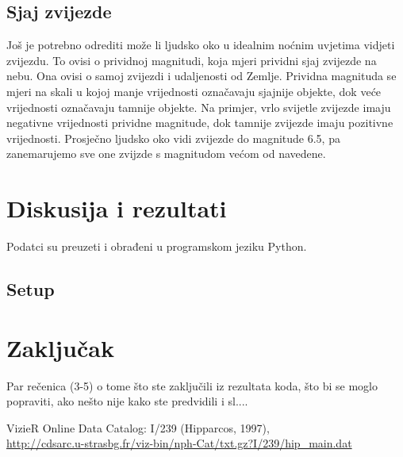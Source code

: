 \documentclass[a4paper,12pt]{article}
\begin{document}
\subsection{Sjaj zvijezde}
Još je potrebno odrediti može li ljudsko oko u idealnim noćnim uvjetima vidjeti zvijezdu. To ovisi o prividnoj magnitudi, koja mjeri prividni sjaj zvijezde na nebu. Ona ovisi o samoj zvijezdi i udaljenosti od Zemlje.
Prividna magnituda se mjeri na skali u kojoj manje vrijednosti označavaju sjajnije objekte, dok veće vrijednosti označavaju tamnije objekte. Na primjer, vrlo svijetle zvijezde imaju negativne vrijednosti prividne magnitude, dok tamnije zvijezde imaju pozitivne vrijednosti. Prosječno ljudsko oko vidi zvijezde do magnitude 6.5, pa zanemarujemo sve one zvijzde s magnitudom većom od navedene.



\section{Diskusija i rezultati}
Podatci su preuzeti i obrađeni u programskom jeziku Python.
\subsection{Setup}



\section{Zaključak}
Par rečenica (3-5) o tome što ste zaključili iz rezultata koda, što bi se moglo popraviti, ako nešto nije kako ste predvidili i sl....



\begin{thebibliography}{9}
  VizieR Online Data Catalog: I/239 (Hipparcos, 1997),\\
  \url{http://cdsarc.u-strasbg.fr/viz-bin/nph-Cat/txt.gz?I/239/hip_main.dat}
\end{thebibliography}
\end{document}
